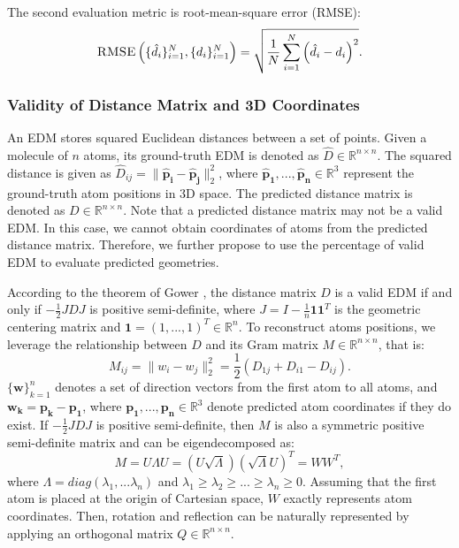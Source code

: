 \documentclass{article}
\begin{document}
The second evaluation metric is root-mean-square error (\textsc{RMSE}):
\begin{equation}\label{eqn:rmse}
    \textsc{RMSE}\left(\{\hat{d}_i\}_{i=1}^N,\{d_i\}_{i=1}^N\right)=\sqrt{\frac{1}{N}\sum_{i=1}^N \left(\hat{d}_i-d_i\right)^2}.
\end{equation}

\subsubsection{Validity of Distance Matrix and 3D Coordinates}
\label{sec:validity}

An EDM stores squared Euclidean distances between a set of points. Given a molecule of $n$ atoms, its ground-truth EDM is denoted as $\hat{D} \in \mathbb{R}^{n \times n}$. The squared distance is given as $\hat{D}_{ij}=\|\boldsymbol{\hat{p}_i}-\boldsymbol{\hat{p}_j}\|_2^2$, where $\boldsymbol{\hat{p}_1}, ..., \boldsymbol{\hat{p}_n} \in \mathbb{R}^3$ represent the ground-truth atom positions in 3D space. The predicted distance matrix is denoted as $D \in \mathbb{R}^{n \times n}$. Note that a predicted distance matrix may not be a valid EDM. In this case, we cannot obtain coordinates of atoms from the predicted distance matrix. Therefore, we further propose to use the percentage of valid EDM to evaluate predicted geometries.



According to the theorem of Gower \cite{gower1982euclidean}, the distance matrix $D$ is a valid EDM if and only if $-\frac{1}{2}JDJ$ is positive semi-definite, where $J=I-\frac{1}{n} \bm 1 \bm 1^T$ is the geometric centering matrix and $\bm 1=(1,...,1)^T \in \mathbb{R}^n$. To reconstruct atoms positions, we leverage the relationship between $D$ and its Gram matrix $M \in \mathbb{R}^{n \times n}$, that is:
\begin{equation}
    M_{ij} = \|w_i-w_j\|_2^2 = \frac{1}{2} \left(D_{1j}+D_{i1}-D_{ij}\right).
\end{equation}
$\{\boldsymbol{w}\}_{k=1}^n$ denotes a set of direction vectors from the first atom to all atoms, and $\boldsymbol{w_k}=\boldsymbol{p_k}-\boldsymbol{p_1}$, where $\boldsymbol{p_1}, ..., \boldsymbol{p_n} \in \mathbb{R}^3$ denote predicted atom coordinates if they do exist. If $-\frac{1}{2}JDJ$ is positive semi-definite, then $M$ is also a symmetric positive semi-definite matrix and can be eigendecomposed as:
\begin{equation}
    M = U \Lambda U = \left(U \sqrt{\Lambda}\right) \left(\sqrt{\Lambda} U\right)^T = WW^T,
\end{equation} 
where $\Lambda=diag(\lambda_1,...\lambda_n)$ and $\lambda_1 \ge \lambda_2 \ge...\ge \lambda_n \ge 0$. Assuming that the first atom is placed at the origin of Cartesian space, $W$ exactly represents atom coordinates. Then, rotation and reflection can be naturally represented by applying an orthogonal matrix $Q \in \mathbb{R}^{n \times n}$. 
\end{document}
